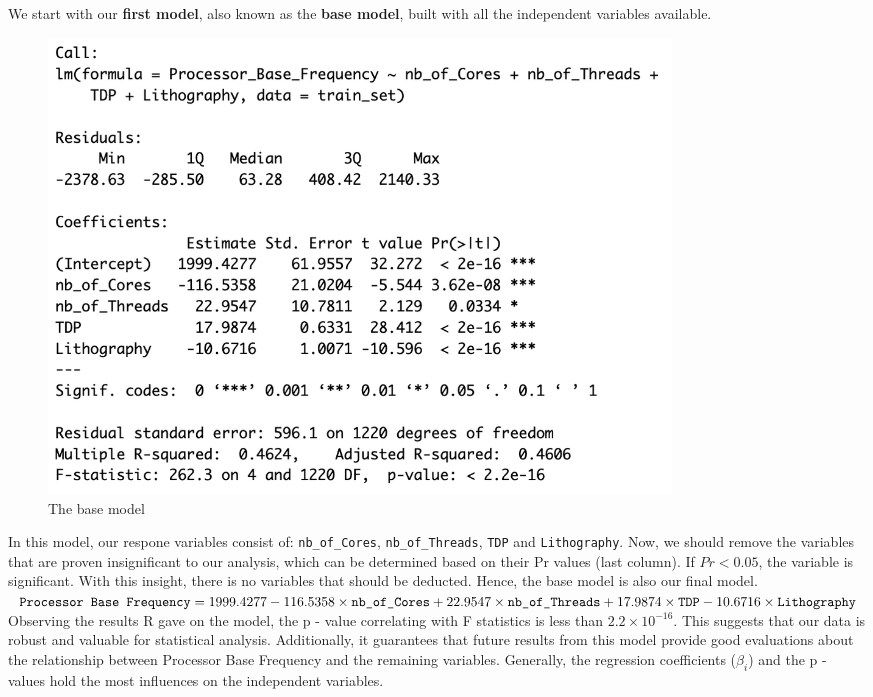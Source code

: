 We start with our \textbf{first model}, also known as the \textbf{base model}, built with all the independent variables available. \\

\begin{figure}[H]
    \centering
    \includegraphics[width=0.8\textwidth]{graphics/base_model_new.png}
    \caption{The base model}
\end{figure}


In this model, our respone variables consist of: \texttt{nb\_of\_Cores}, \texttt{nb\_of\_Threads}, \texttt{TDP} and \texttt{Lithography}. Now, we should remove the variables that are proven insignificant to our analysis, which can be determined based on their Pr values (last column). If $Pr < 0.05$, the variable is significant. With this insight, there is no variables that should be deducted. Hence, the base model is also our final model. \\

$\text{\texttt{Processor Base Frequency}} = 1999.4277 - 116.5358 \times \text{\texttt{nb\_of\_Cores}} + 22.9547 \times \text{\texttt{nb\_of\_Threads}} + 17.9874 \times \text{\texttt{TDP}} - 10.6716 \times \text{\texttt{Lithography}}$ \\

Observing the results R gave on the model, the p - value correlating with F statistics is less than $2.2 \times 10^{-16}$. This suggests that our data is robust and valuable for statistical analysis. Additionally, it guarantees that future results from this model provide good evaluations about the relationship between Processor Base Frequency and the remaining variables. Generally, the regression coefficients ($\beta_i$) and the p - values hold the most influences on the independent variables. 

